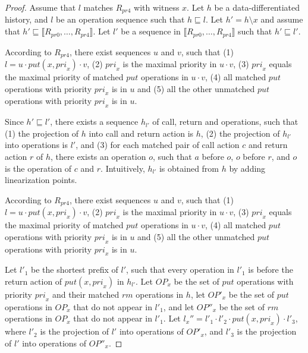 \documentclass{llncs}
\begin{document}
\begin {proof}

Assume that $l$ matches $R_{\textit{pr4}}$ with witness $x$. Let $h$ be a data-differentiated history, and $l$ be an operation sequence such that $h \sqsubseteq l$. Let $h'=h \setminus x$ and assume that $h' \sqsubseteq \llbracket R_{\textit{pr0}},\ldots,R_{\textit{pr4}} \rrbracket$. Let $l'$ be a sequence in $\llbracket R_{\textit{pr0}},\ldots,R_{\textit{pr4}} \rrbracket$ such that $h' \sqsubseteq l'$.

According to $R_{\textit{pr4}}$, there exist sequences $u$ and $v$, such that (1) $l=u \cdot \textit{put}(x,\textit{pri}_x) \cdot v$, (2) $\textit{pri}_x$ is the maximal priority in $u \cdot v$, (3) $\textit{pri}_x$ equals the maximal priority of matched $\textit{put}$ operations in $u \cdot v$, (4) all matched $\textit{put}$ operations with priority $\textit{pri}_x$ is in $u$ and (5) all the other unmatched $\textit{put}$ operations with priority $\textit{pri}_x$ is in $u$.

Since $h' \sqsubseteq l'$, there exists a sequence $h_{l'}$ of call, return and operations, such that (1) the projection of $h$ into call and return action is $h$, (2) the projection of $h_{l'}$ into operations is $l'$, and (3) for each matched pair of call action $c$ and return action $r$ of $h$, there exists an operation $o$, such that $a$ before $o$, $o$ before $r$, and $o$ is the operation of $c$ and $r$. Intuitively, $h_{l'}$ is obtained from $h$ by adding linearization points.

According to $R_{\textit{pr4}}$, there exist sequences $u$ and $v$, such that (1) $l=u \cdot \textit{put}(x,\textit{pri}_x) \cdot v$, (2) $\textit{pri}_x$ is the maximal priority in $u \cdot v$, (3) $\textit{pri}_x$ equals the maximal priority of matched $\textit{put}$ operations in $u \cdot v$, (4) all matched $\textit{put}$ operations with priority $\textit{pri}_x$ is in $u$ and (5) all the other unmatched $\textit{put}$ operations with priority $\textit{pri}_x$ is in $u$.

Let $l'_1$ be the shortest prefix of $l'$, such that every operation in $l'_1$ is before the return action of $\textit{put}(x,\textit{pri}_x)$ in $h_{l'}$. Let $\textit{OP}_x$ be the set of $\textit{put}$ operations with priority $\textit{pri}_x$ and their matched $\textit{rm}$ operations in $h$, let $\textit{OP}'_x$ be the set of $\textit{put}$ operations in $\textit{OP}_x$ that do not appear in $l'_1$, and let $\textit{OP}''_x$ be the set of $\textit{rm}$ operations in $\textit{OP}_x$ that do not appear in $l'_1$. Let $l_x''=l'_1 \cdot l'_2 \cdot \textit{put}(x,\textit{pri}_x) \cdot l'_3$, where $l'_2$ is the projection of $l'$ into operations of $\textit{OP}'_x$, and $l'_3$ is the projection of $l'$ into operations of $\textit{OP}''_x$.


\end{proof}
\end{document}

